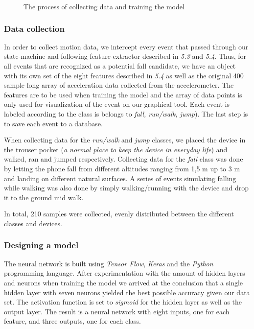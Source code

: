 \documentclass[12pt, a4paper, onecolumn]{article}
\begin{document}
	\begin{figure}[H]
		\centering
		\caption{The process of collecting data and training the model}%
		\label{fig:training-model}%
	\end{figure}
	
	\subsubsection{Data collection}
	In order to collect motion data, we intercept every event that passed through our state-machine and following feature-extractor described in \textit{5.3} and \textit{5.4}. Thus, for all events that are recognized as a potential fall candidate, we have an object with its own set of the eight features described in \textit{5.4} as well as the original 400 sample long array of acceleration data collected from the accelerometer. The features are to be used when training the model and the array of data points is only used for visualization of the event on our graphical tool. Each event is labeled according to the class is belongs to \textit{fall, run/walk, jump}). The last step is to save each event to a database. 
	
	When collecting data for the \textit{run/walk} and \textit{jump} classes, we placed the device in the trouser pocket (\textit{a normal place to keep the device in everyday life}) and walked, ran and jumped respectively. Collecting data for the \textit{fall} class was done by letting the phone fall from different altitudes ranging from 1,5 m up to 3 m and landing on different natural surfaces. A series of events simulating falling while walking was also done by simply walking/running with the device and drop it to the ground mid walk.
	
	In total, 210 samples were collected, evenly distributed between the different classes and devices.
	
	\subsubsection{Designing a model}
	The neural network is built using \textit{Tensor Flow}, \textit{Keras} and the \textit{Python} programming language. After experimentation with the amount of hidden layers and neurons when training the model we arrived at the conclusion that a single hidden layer with seven neurons yielded the best possible accuracy given our data set. The activation function is set to \textit{sigmoid} for the hidden layer as well as the output layer. The result is a neural network with eight inputs, one for each feature, and three outputs, one for each class. 
	
\end{document}
